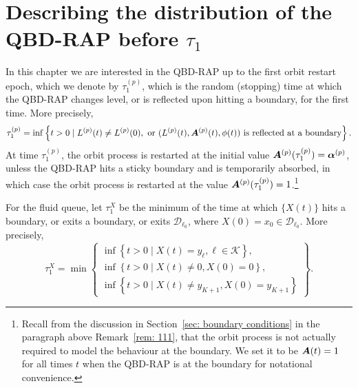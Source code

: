 \section{Describing the distribution of the QBD-RAP before \(\tau_1\)}\label{sec: qbd dists}
In this chapter we are interested in the QBD-RAP up to the first orbit restart epoch, which we denote by \(\tau_1^{(p)}\), which is the random (stopping) time at which the QBD-RAP changes level, or is reflected upon hitting a boundary, for the first time. More precisely, 
\[\tau_1^{(p)} = \inf\left\{t>0\mid L^{(p)}(t)\neq L^{(p)}(0),\mbox{ or }(L^{(p)}(t),\boldsymbol A^{(p)}(t),\phi(t))\mbox{ is reflected at a boundary}\right\}.\]
At time \(\tau_1^{(p)}\), the orbit process is restarted at the initial value \(\boldsymbol A^{(p)}(\tau_1^{(p)}) = \boldsymbol \alpha^{(p)}\), unless the QBD-RAP hits a sticky boundary and is temporarily absorbed, in which case the orbit process is restarted at the value \(\boldsymbol A^{(p)}(\tau_1^{(p)}) = 1\).\footnote{Recall from the discussion in Section~\ref{sec: boundary conditions} in the paragraph above Remark~\ref{rem: 111}, that the orbit process is not actually required to model the behaviour at the boundary. We set it to be \(\boldsymbol A(t) =1\) for all times \(t\) when the QBD-RAP is at the boundary for notational convenience.}

For the fluid queue, let \(\tau_1^X\) be the minimum of the time at which \(\{X(t)\}\) hits a boundary, or exits a boundary, or exits \(\mathcal D_{\ell_0}\), where \(X(0)=x_0\in\mathcal D_{\ell_0}\). More precisely, 
\[\tau_1^X = \min\left\{\begin{array}{c}\inf\left\{t>0\mid X(t)=y_{\ell}, \ell\in\mathcal K\right\}, \\ \inf\left\{t>0 \mid X(t) \neq 0, X(0)=0\right\}, \\ \inf\left\{t>0 \mid X(t) \neq y_{K+1}, X(0)=y_{K+1}\right\} \end{array} \right\}.\]


